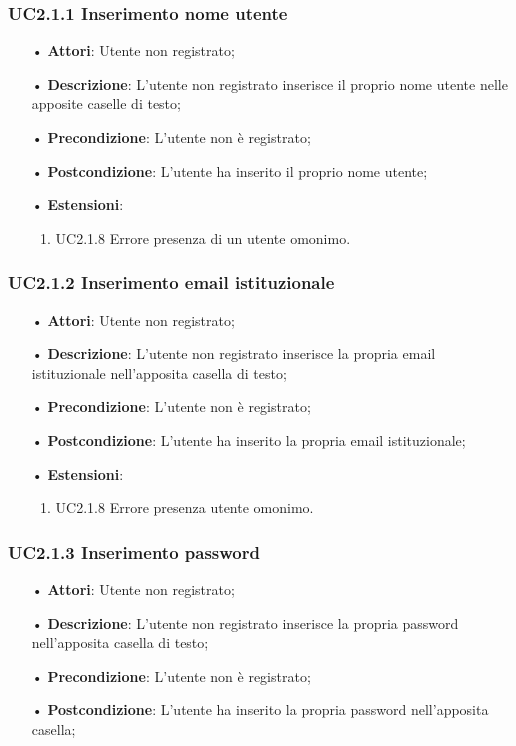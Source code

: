 \subsubsection{UC2.1.1 Inserimento nome utente}
\begin{itemize}
	\item[•] \textbf{Attori}: Utente non registrato;
	\item[•] \textbf{Descrizione}: L'utente non registrato inserisce il proprio nome utente nelle apposite caselle di testo;
	\item[•] \textbf{Precondizione}: L’utente non è registrato;
	\item[•] \textbf{Postcondizione}: L'utente ha inserito il proprio nome utente;
	\item[•] \textbf{Estensioni}:
		\begin{enumerate}
			\item UC2.1.8 Errore presenza di un utente omonimo.
		\end{enumerate}
\end{itemize}

\subsubsection{UC2.1.2 Inserimento email istituzionale}
\begin{itemize}
	\item[•] \textbf{Attori}: Utente non registrato;
	\item[•] \textbf{Descrizione}: L'utente non registrato inserisce la propria email istituzionale nell'apposita casella di testo;
	\item[•] \textbf{Precondizione}: L’utente non è registrato;
	\item[•] \textbf{Postcondizione}: L'utente ha inserito la propria email istituzionale;	
	\item[•] \textbf{Estensioni}:
		\begin{enumerate}			
			\item UC2.1.8 Errore presenza utente omonimo.
		\end{enumerate}
\end{itemize}

\subsubsection{UC2.1.3 Inserimento password}
\begin{itemize}
	\item[•] \textbf{Attori}: Utente non registrato;
	\item[•] \textbf{Descrizione}: L'utente non registrato inserisce la propria password nell'apposita casella di testo;
	\item[•] \textbf{Precondizione}: L’utente non è registrato;
	\item[•] \textbf{Postcondizione}: L'utente ha inserito la propria password nell'apposita casella;
\end{itemize}

